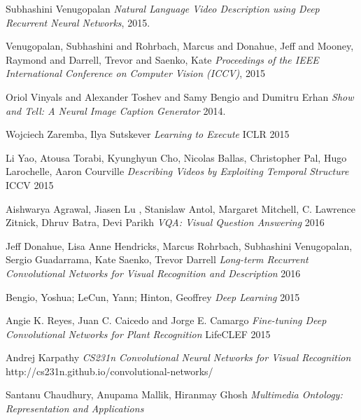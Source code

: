 \documentclass[12pt]{article}
\begin{document}
	\begin{thebibliography}{1}
	
	   Subhashini Venugopalan {\em Natural Language Video Description using Deep Recurrent Neural Networks}, 2015.
	
	    Venugopalan, Subhashini and Rohrbach, Marcus and Donahue, Jeff
                    and Mooney, Raymond and Darrell, Trevor and Saenko, Kate {\em Proceedings of the IEEE International Conference on Computer Vision (ICCV)}, 2015
	
	   Oriol Vinyals and
               Alexander Toshev and
               Samy Bengio and
               Dumitru Erhan {\em Show and Tell: {A} Neural Image Caption Generator} 2014.

         Wojciech Zaremba, Ilya Sutskever {\em Learning to Execute} ICLR 2015
         

           Li Yao, Atousa Torabi, Kyunghyun Cho, Nicolas Ballas, Christopher Pal, Hugo Larochelle, Aaron Courville {\em Describing Videos by Exploiting Temporal Structure} ICCV 2015
        

          Aishwarya Agrawal, Jiasen Lu , Stanislaw Antol,
		Margaret Mitchell, C. Lawrence Zitnick, Dhruv Batra, Devi Parikh {\em VQA: Visual Question Answering} 2016
        

          Jeff Donahue, Lisa Anne Hendricks, Marcus Rohrbach, Subhashini Venugopalan, Sergio Guadarrama, Kate Saenko, Trevor Darrell {\em Long-term Recurrent Convolutional Networks for Visual Recognition and Description} 2016

          Bengio, Yoshua; LeCun, Yann; Hinton, Geoffrey {\em Deep Learning} 2015

          Angie K. Reyes, Juan C. Caicedo and Jorge E. Camargo {\em Fine-tuning Deep Convolutional Networks for
		Plant Recognition} LifeCLEF 2015

          Andrej Karpathy {\em 
			CS231n Convolutional Neural Networks for Visual Recognition
		} http://cs231n.github.io/convolutional-networks/

		 Santanu Chaudhury, Anupama Mallik, Hiranmay Ghosh {\em Multimedia Ontology: Representation and Applications
		} 

	\end{thebibliography}
\end{document}
